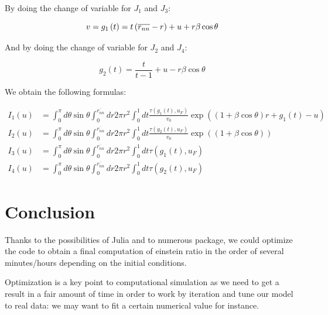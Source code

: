 By doing the change of variable for $J_1$ and $J_3$:

\begin{equation}
    v = g_{1}\left(t\right)=t\left(\overline{r_{n n}}-r\right)+u+r \beta \cos \theta \\
\end{equation}

And by doing the change of variable for $J_2$ and $J_4$:

\begin{equation}
    g_{2}\left(t\right)=\frac{t}{t-1}+u-r \beta \cos \theta
\end{equation}

We obtain the following formulas:

\begin{equation}
    \begin{aligned}
    I_{1}\left(u\right)&=\int_{0}^{\pi} d \theta \sin \theta \int_{0}^{\overline{r_{n n}}} d r 2 \pi r^{2} \int_{0}^{1} d t \frac{\tau\left(g_{1}(t), u_{F}\right)}{v_{0}} \exp \left((1+\beta \cos \theta) r+g_{1}(t)-u\right) \\
    I_{2}\left(u\right)&=\int_{0}^{\pi} d \theta \sin \theta \int_{0}^{\overline{r_{n n}}} d r 2 \pi r^{2} \int_{0}^{1} d t \frac{\tau\left(g_{2}(t), u_{F}\right)}{v_{0}} \exp ((1+\beta \cos \theta)) \\
    I_{3}\left(u\right)&=\int_{0}^{\pi} d \theta \sin \theta \int_{0}^{\overline{r_{n n}}} d r 2 \pi r^{2} \int_{0}^{1} d t \tau\left(g_{1}(t), u_{F}\right) \\
    I_{4}\left(u\right)&=\int_{0}^{\pi} d \theta \sin \theta \int_{0}^{\overline{r_{n n}}} d r 2 \pi r^{2} \int_{0}^{1} d t \tau\left(g_{2}(t), u_{F}\right)
    \end{aligned}
\end{equation}

\section{Conclusion}

Thanks to the possibilities of Julia and to numerous package, we could optimize the code to obtain a final computation of einstein ratio in the order of several minutes/hours depending on the initial conditions.

Optimization is a key point to computational simulation as we need to get a result in a fair amount of time in order to work by iteration and tune our model to real data: we may want to fit a certain numerical value for instance.